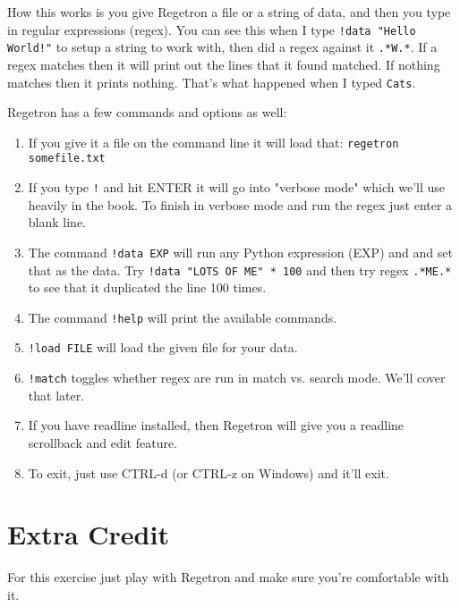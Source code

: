 How this works is you give Regetron a file or a string of data, and then you
type in regular expressions (regex).  You can see this when I type \verb|!data "Hello World!"|
to setup a string to work with, then did a regex against it
\verb|.*W.*|.  If a regex matches then it will print out the lines that it
found matched.  If nothing matches then it prints nothing.  That's what 
happened when I typed \verb|Cats|.

Regetron has a few commands and options as well:

\begin{enumerate}
\item If you give it a file on the command line it will load that: \verb|regetron somefile.txt|
\item If you type \verb|!| and hit ENTER it will go into "verbose mode" which we'll use heavily in the book.  To finish in verbose mode and run the regex
    just enter a blank line.
\item The command \verb|!data EXP| will run any Python expression (EXP) and and set that as the data.  Try \verb|!data "LOTS OF ME" * 100| and then
    try regex \verb|.*ME.*| to see that it duplicated the line 100 times.
\item The command \verb|!help| will print the available commands.
\item \verb|!load FILE| will load the given file for your data.
\item \verb|!match| toggles whether regex are run in match vs. search mode.  We'll cover that later.
\item If you have readline installed, then Regetron will give you a readline scrollback and edit feature.
\item To exit, just use CTRL-d (or CTRL-z on Windows) and it'll exit.
\end{enumerate}

\section{Extra Credit}

For this exercise just play with Regetron and make sure you're comfortable with it.


